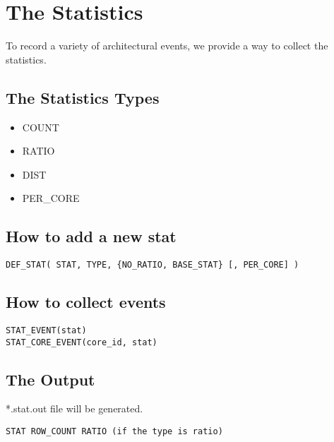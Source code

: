 
\clearpage
\section{The Statistics}
\label{sec:stat}

To record a variety of architectural events, we provide a way to
collect the statistics.


\subsection{The Statistics Types}

\begin{itemize}
  \item COUNT
  \item RATIO
  \item DIST
  \item PER\_CORE
\end{itemize}


\subsection{How to add a new stat}

\smallskip
\begin{lstlisting}
DEF_STAT( STAT, TYPE, {NO_RATIO, BASE_STAT} [, PER_CORE] )
\end{lstlisting}
\smallskip



\subsection{How to collect events}

\smallskip
\begin{lstlisting}
STAT_EVENT(stat)
STAT_CORE_EVENT(core_id, stat)
\end{lstlisting}
\smallskip


\subsection{The Output}

*.stat.out file will be generated.

\smallskip
\begin{lstlisting}
STAT ROW_COUNT RATIO (if the type is ratio)
\end{lstlisting}
\smallskip
